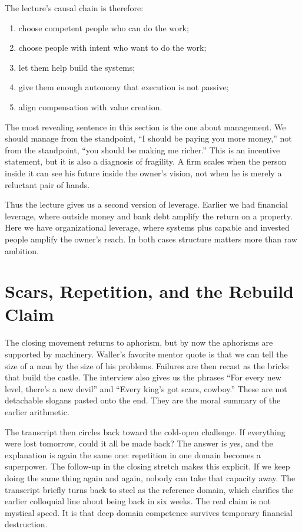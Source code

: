 The lecture's causal chain is therefore:
\begin{enumerate}
\item choose competent people who can do the work;
\item choose people with intent who want to do the work;
\item let them help build the systems;
\item give them enough autonomy that execution is not passive;
\item align compensation with value creation.
\end{enumerate}

The most revealing sentence in this section is the one about management. We should manage from the standpoint, ``I should be paying you more money,'' not from the standpoint, ``you should be making me richer.'' This is an incentive statement, but it is also a diagnosis of fragility. A firm scales when the person inside it can see his future inside the owner's vision, not when he is merely a reluctant pair of hands.

Thus the lecture gives us a second version of leverage. Earlier we had financial leverage, where outside money and bank debt amplify the return on a property. Here we have organizational leverage, where systems plus capable and invested people amplify the owner's reach. In both cases structure matters more than raw ambition.

\section{Scars, Repetition, and the Rebuild Claim}

The closing movement returns to aphorism, but by now the aphorisms are supported by machinery. Waller's favorite mentor quote is that we can tell the size of a man by the size of his problems. Failures are then recast as the bricks that build the castle. The interview also gives us the phrases ``For every new level, there's a new devil'' and ``Every king's got scars, cowboy.'' These are not detachable slogans pasted onto the end. They are the moral summary of the earlier arithmetic.

The transcript then circles back toward the cold-open challenge. If everything were lost tomorrow, could it all be made back? The answer is yes, and the explanation is again the same one: repetition in one domain becomes a superpower. The follow-up in the closing stretch makes this explicit. If we keep doing the same thing again and again, nobody can take that capacity away. The transcript briefly turns back to steel as the reference domain, which clarifies the earlier colloquial line about being back in six weeks. The real claim is not mystical speed. It is that deep domain competence survives temporary financial destruction.

